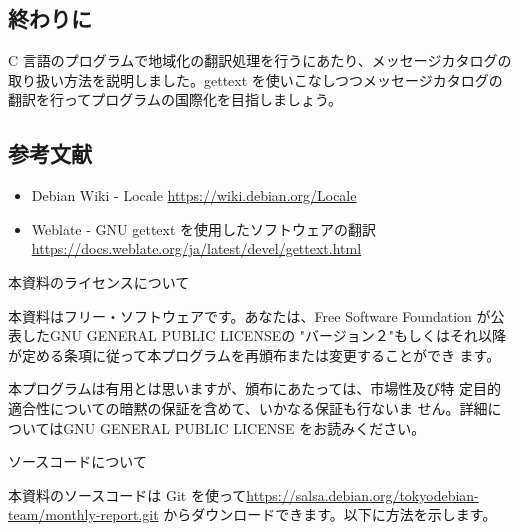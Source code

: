\documentclass[mingoth,a4paper]{jsarticle}
\begin{document}
\subsection{終わりに}

C 言語のプログラムで地域化の翻訳処理を行うにあたり、メッセージカタログの取り扱い方法を説明しました。gettext を使いこなしつつメッセージカタログの翻訳を行ってプログラムの国際化を目指しましょう。

\subsection{参考文献}

\begin{itemize}
\item Debian Wiki - Locale \url{https://wiki.debian.org/Locale}
\item Weblate - GNU gettext を使用したソフトウェアの翻訳 \\ \url{https://docs.weblate.org/ja/latest/devel/gettext.html}
\end{itemize}
      
%

\newpage

\begin{center}
本資料のライセンスについて
\end{center}

\begin{fontsize}{6}{6}

本資料はフリー・ソフトウェアです。あなたは、Free Software
Foundation が公表したGNU GENERAL PUBLIC LICENSEの "バージョン２"もしくはそれ以降
が定める条項に従って本プログラムを再頒布または変更することができ
ます。

本プログラムは有用とは思いますが、頒布にあたっては、市場性及び特
定目的適合性についての暗黙の保証を含めて、いかなる保証も行ないま
せん。詳細についてはGNU GENERAL PUBLIC LICENSE をお読みください。

\end{fontsize}

\begin{center}
ソースコードについて
\end{center}

本資料のソースコードは Git を使って\url{https://salsa.debian.org/tokyodebian-team/monthly-report.git}
からダウンロードできます。以下に方法を示します。
\end{document}

